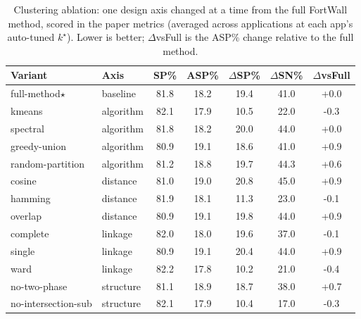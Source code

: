 \begin{table}[t]
\centering
\caption{Clustering ablation: one design axis changed at a time from the full FortWall method, scored in the paper metrics (averaged across applications at each app's auto-tuned $k^\star$). Lower is better; $\Delta$vsFull is the ASP\% change relative to the full method.}
\label{tab:ablation}
\begin{tabular}{llccccc}
\toprule
Variant & Axis & SP\% & ASP\% & $\Delta$SP\% & $\Delta$SN\% & $\Delta$vsFull \\
\midrule
full-method$\star$ & baseline & 81.8 & 18.2 & 19.4 & 41.0 & +0.0 \\
kmeans & algorithm & 82.1 & 17.9 & 10.5 & 22.0 & -0.3 \\
spectral & algorithm & 81.8 & 18.2 & 20.0 & 44.0 & +0.0 \\
greedy-union & algorithm & 80.9 & 19.1 & 18.6 & 41.0 & +0.9 \\
random-partition & algorithm & 81.2 & 18.8 & 19.7 & 44.3 & +0.6 \\
cosine & distance & 81.0 & 19.0 & 20.8 & 45.0 & +0.9 \\
hamming & distance & 81.9 & 18.1 & 11.3 & 23.0 & -0.1 \\
overlap & distance & 80.9 & 19.1 & 19.8 & 44.0 & +0.9 \\
complete & linkage & 82.0 & 18.0 & 19.6 & 37.0 & -0.1 \\
single & linkage & 80.9 & 19.1 & 20.4 & 44.0 & +0.9 \\
ward & linkage & 82.2 & 17.8 & 10.2 & 21.0 & -0.4 \\
no-two-phase & structure & 81.1 & 18.9 & 18.7 & 38.0 & +0.7 \\
no-intersection-sub & structure & 82.1 & 17.9 & 10.4 & 17.0 & -0.3 \\
\bottomrule
\end{tabular}
\end{table}
